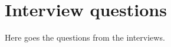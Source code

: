 




\chapter{Interview questions}
\label{chapter:interview-questions}

Here goes the questions from the interviews.
